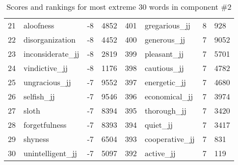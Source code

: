 \begin{table}[tbp]
\begin{tabular}{| rlr@{.}l | rlr@{.}l |}
    21 & aloofness & -8 & 4852    &    401 & gregarious\_jj & 8 & 928 \\
    22 & disorganization & -8 & 4452    &    400 & generous\_jj & 7 & 9052 \\
    23 & inconsiderate\_jj & -8 & 2819    &    399 & pleasant\_jj & 7 & 5701 \\
    24 & vindictive\_jj & -8 & 1176    &    398 & cautious\_jj & 7 & 4782 \\
    25 & ungracious\_jj & -7 & 9552    &    397 & energetic\_jj & 7 & 4680 \\
    26 & selfish\_jj & -7 & 9546    &    396 & economical\_jj & 7 & 3974 \\
    27 & sloth & -7 & 8394    &    395 & thorough\_jj & 7 & 3420 \\
    28 & forgetfulness & -7 & 8393    &    394 & quiet\_jj & 7 & 3417 \\
    29 & shyness & -7 & 6504    &    393 & cooperative\_jj & 7 & 831 \\
    30 & unintelligent\_jj & -7 & 5097    &    392 & active\_jj & 7 & 119 \\
    \hline
    \end{tabular}
    \caption{Scores and rankings for most extreme 30 words in component \#2} 
\end{table}
\clearpage
